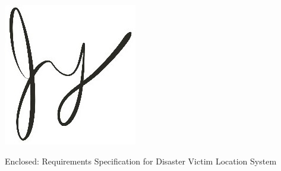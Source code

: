 \documentclass[11pt]{letter}
\begin{document}
\begin{letter}
\vspace*{-0.25cm}
\includegraphics[scale=0.8]{signature.jpg}

{Enclosed: Requirements Specification for Disaster Victim Location System}

\end{letter}
\end{document}
